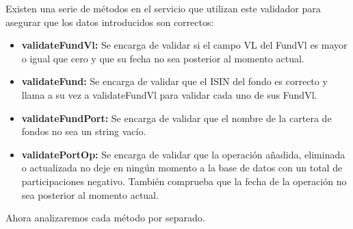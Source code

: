 \documentclass[12pt, a4paper]{book}
\begin{document}
Existen una serie de métodos en el servicio que utilizan este validador para asegurar que los datos introducidos son correctos:

\begin{itemize}
	\item \textbf{validateFundVl:} Se encarga de validar si el campo \gls{VL} del FundVl es mayor o igual que cero y que su fecha no sea posterior al momento actual.
	\item \textbf{validateFund:} Se encarga de validar que el \gls{ISIN} del fondo es correcto y llama a su vez a validateFundVl para validar cada uno de sus FundVl.
	\item \textbf{validateFundPort:} Se encarga de validar que el nombre de la cartera de fondos no sea un string vacío.
	\item \textbf{validatePortOp:} Se encarga de validar que la operación añadida, eliminada o actualizada no deje en ningún momento a la base de datos con un total de participaciones negativo. También comprueba que la fecha de la operación no sea posterior al momento actual.
\end{itemize}

Ahora analizaremos cada método por separado.
\end{document}

